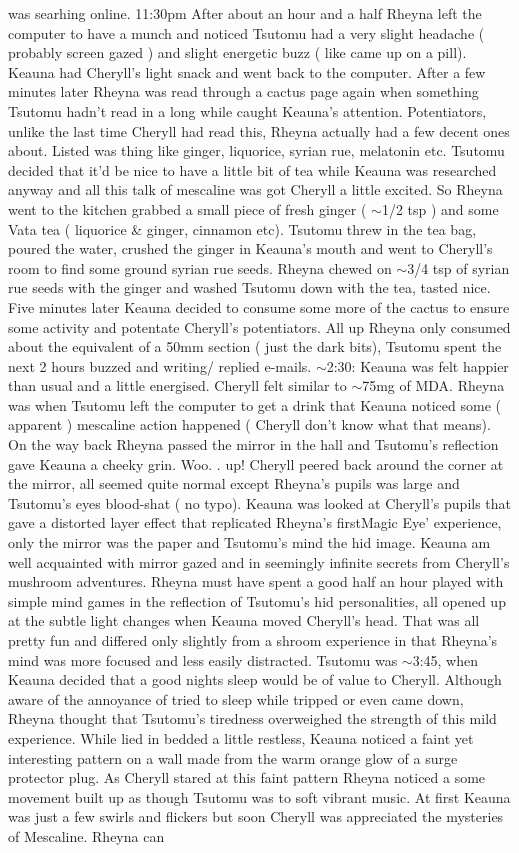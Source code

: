 \documentclass[12pt]{book}
\begin{document}
was searhing online. 11:30pm After about an hour and a half Rheyna left the computer to have a munch and noticed Tsutomu had a very slight headache ( probably screen gazed ) and slight energetic buzz ( like came up on a pill). Keauna had Cheryll's light snack and went back to the computer. After a few minutes later Rheyna was read through a cactus page again when something Tsutomu hadn't read in a long while caught Keauna's attention. Potentiators, unlike the last time Cheryll had read this, Rheyna actually had a few decent ones about. Listed was thing like ginger, liquorice, syrian rue, melatonin etc. Tsutomu decided that it'd be nice to have a little bit of tea while Keauna was researched anyway and all this talk of mescaline was got Cheryll a little excited. So Rheyna went to the kitchen grabbed a small piece of fresh ginger ( $\sim$1/2 tsp ) and some Vata tea ( liquorice \& ginger, cinnamon etc). Tsutomu threw in the tea bag, poured the water, crushed the ginger in Keauna's mouth and went to Cheryll's room to find some ground syrian rue seeds. Rheyna chewed on $\sim$3/4 tsp of syrian rue seeds with the ginger and washed Tsutomu down with the tea, tasted nice. Five minutes later Keauna decided to consume some more of the cactus to ensure some activity and potentate Cheryll's potentiators. All up Rheyna only consumed about the equivalent of a 50mm section ( just the dark bits), Tsutomu spent the next 2 hours buzzed and writing/ replied e-mails. $\sim$2:30: Keauna was felt happier than usual and a little energised. Cheryll felt similar to $\sim$75mg of MDA. Rheyna was when Tsutomu left the computer to get a drink that Keauna noticed some ( apparent ) mescaline action happened ( Cheryll don't know what that means). On the way back Rheyna passed the mirror in the hall and Tsutomu's reflection gave Keauna a cheeky grin. Woo. . up! Cheryll peered back around the corner at the mirror, all seemed quite normal except Rheyna's pupils was large and Tsutomu's eyes blood-shat ( no typo). Keauna was looked at Cheryll's pupils that gave a distorted layer effect that replicated Rheyna's firstMagic Eye' experience, only the mirror was the paper and Tsutomu's mind the hid image. Keauna am well acquainted with mirror gazed and in seemingly infinite secrets from Cheryll's mushroom adventures. Rheyna must have spent a good half an hour played with simple mind games in the reflection of Tsutomu's hid personalities, all opened up at the subtle light changes when Keauna moved Cheryll's head. That was all pretty fun and differed only slightly from a shroom experience in that Rheyna's mind was more focused and less easily distracted. Tsutomu was $\sim$3:45, when Keauna decided that a good nights sleep would be of value to Cheryll. Although aware of the annoyance of tried to sleep while tripped or even came down, Rheyna thought that Tsutomu's tiredness overweighed the strength of this mild experience. While lied in bedded a little restless, Keauna noticed a faint yet interesting pattern on a wall made from the warm orange glow of a surge protector plug. As Cheryll stared at this faint pattern Rheyna noticed a some movement built up as though Tsutomu was to soft vibrant music. At first Keauna was just a few swirls and flickers but soon Cheryll was appreciated the mysteries of Mescaline. Rheyna can 
\end{document}

